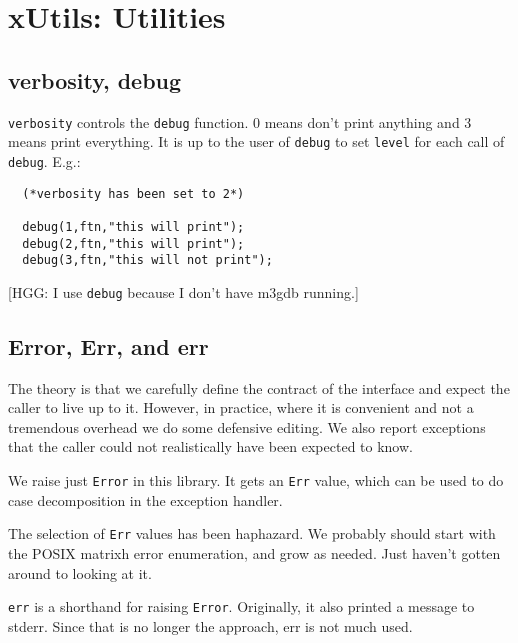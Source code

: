 \section{xUtils: Utilities}

\subsection*{verbosity, debug}
{\tt verbosity} controls the {\tt debug} function.
0 means don't print anything and 3 means print everything.
It is up to the user of {\tt debug} to
set {\tt level} for each call of {\tt debug}.  E.g.:

\begin {tt} \begin{verbatim}
  (*verbosity has been set to 2*)

  debug(1,ftn,"this will print");
  debug(2,ftn,"this will print");
  debug(3,ftn,"this will not print");
\end{verbatim} \end{tt}

[HGG: I use {\tt debug} because I don't have m3gdb running.]

\subsection*{Error, Err, and err}
The theory is that we carefully define the contract of the interface and
expect the caller to live up to it.  However, in practice, where
it is convenient and not a tremendous overhead we do some defensive
editing.  We also report exceptions that the caller could not
realistically have been expected to know.

We raise just {\tt Error} in this library.
It gets an {\tt Err} value, which can be
used to do case decomposition in the exception handler.

The selection of {\tt Err} values has been haphazard.  We probably should
start with the POSIX matrixh error enumeration, and grow as needed.
Just haven't gotten around to looking at it.

{\tt err} is a shorthand for raising {\tt Error}.
Originally, it also printed
a message to stderr. Since that is no longer the approach, err is not
much used.

 
